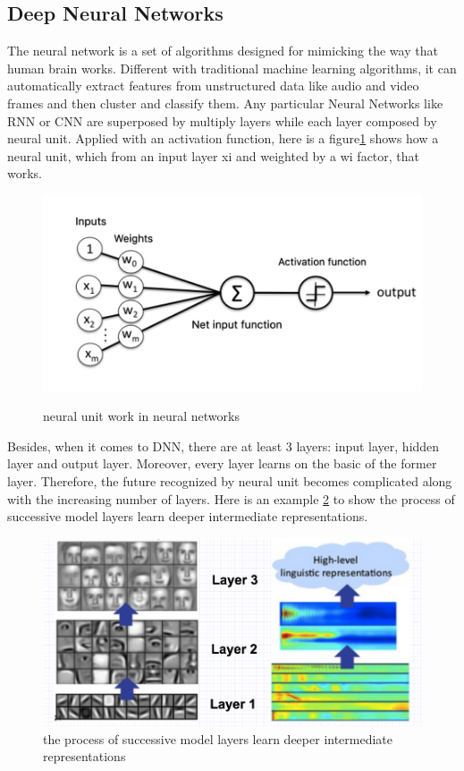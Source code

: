 \subsection{Deep Neural Networks }
The neural network is a set of algorithms designed for mimicking the way that human brain works. Different with traditional machine learning algorithms, it can automatically extract features from unstructured data like audio and video frames and then cluster and classify them. Any particular Neural Networks like RNN or CNN are superposed by multiply layers while each layer composed by neural unit. Applied with an activation function, here is a figure\ref{fig:nn} shows how a neural unit, which from an input layer xi and weighted by a wi factor, that works.
\begin{figure}[ht]
\centering
\includegraphics[width=0.5\linewidth]{figures/nn.png}\\[1cm]
\caption{neural unit work in neural networks}
\label{fig:nn}
\end{figure}




Besides, when it comes to DNN, there are at least 3 layers: input layer, hidden layer and output layer. Moreover, every layer learns on the basic of the former layer. Therefore, the future recognized by neural unit becomes complicated along with the increasing number of layers. 
Here is an example \ref{fig:dnn} to show the process of successive model layers learn deeper intermediate representations.
\begin{figure}[ht]
\centering
\includegraphics[width=1\linewidth]{figures/dnn.png}
\caption{the process of successive model layers learn deeper intermediate representations}
\label{fig:dnn}
\end{figure}

